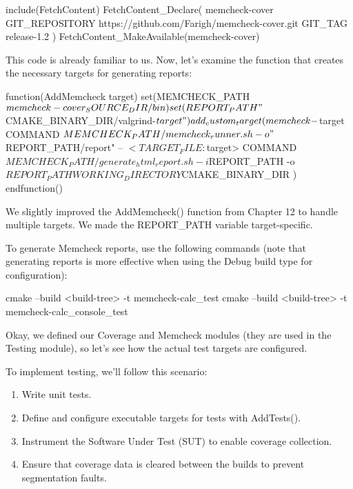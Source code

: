 
\begin{cmake}
include(FetchContent)
FetchContent_Declare(
    memcheck-cover
    GIT_REPOSITORY https://github.com/Farigh/memcheck-cover.git
    GIT_TAG release-1.2
)
FetchContent_MakeAvailable(memcheck-cover)
\end{cmake}

This code is already familiar to us. Now, let’s examine the function that creates the necessary targets for generating reports:


\begin{cmake}
function(AddMemcheck target)
    set(MEMCHECK_PATH ${memcheck-cover_SOURCE_DIR}/bin)
    set(REPORT_PATH "${CMAKE_BINARY_DIR}/valgrind-${target}")
    add_custom_target(memcheck-${target}
        COMMAND ${MEMCHECK_PATH}/memcheck_runner.sh -o
            "${REPORT_PATH}/report"
            -- $<TARGET_FILE:${target}>
        COMMAND ${MEMCHECK_PATH}/generate_html_report.sh
            -i ${REPORT_PATH}
            -o ${REPORT_PATH}
        WORKING_DIRECTORY ${CMAKE_BINARY_DIR}
    )
endfunction()
\end{cmake}

We slightly improved the AddMemcheck() function from Chapter 12 to handle multiple targets. We made the REPORT\_PATH variable target-specific.

To generate Memcheck reports, use the following commands (note that generating reports is more effective when using the Debug build type for configuration):

\begin{shell}
cmake --build <build-tree> -t memcheck-calc_test
cmake --build <build-tree> -t memcheck-calc_console_test
\end{shell}

Okay, we defined our Coverage and Memcheck modules (they are used in the Testing module), so let’s see how the actual test targets are configured.


To implement testing, we’ll follow this scenario:

\begin{enumerate}
\item
Write unit tests.

\item
Define and configure executable targets for tests with AddTests().

\item
Instrument the Software Under Test (SUT) to enable coverage collection.

\item
Ensure that coverage data is cleared between the builds to prevent segmentation faults.
\end{enumerate}

